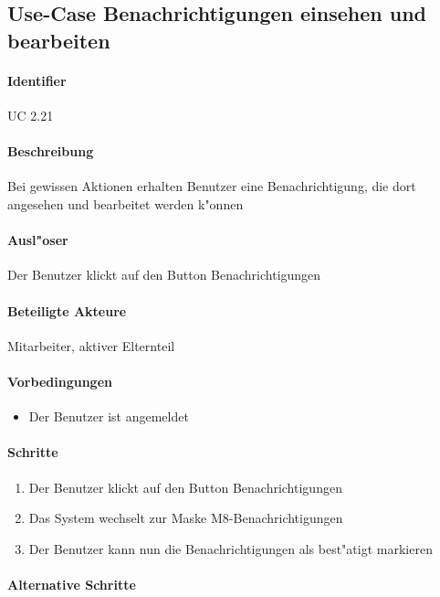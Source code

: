   

  
  \newpage
 \subsection{Use-Case Benachrichtigungen einsehen und bearbeiten}
  \paragraph{Identifier}
  UC 2.21
  \paragraph{Beschreibung}
  Bei gewissen Aktionen erhalten Benutzer eine Benachrichtigung, die dort angesehen und bearbeitet werden k"onnen
  \paragraph{Ausl"oser}
  Der Benutzer klickt auf den Button \dq Benachrichtigungen\dq
  \paragraph{Beteiligte Akteure}   \leavevmode \newline
    Mitarbeiter, aktiver Elternteil
  \paragraph{Vorbedingungen}
  \begin{itemize}
   \item Der Benutzer ist angemeldet
  \end{itemize}

  \paragraph{Schritte}
  \begin{enumerate}
   \item Der Benutzer klickt auf den Button \dq Benachrichtigungen\dq
   \item Das System wechselt zur Maske M8-Benachrichtigungen
   \item Der Benutzer kann nun die Benachrichtigungen als best"atigt markieren
  \end{enumerate}

  \paragraph{Alternative Schritte}
